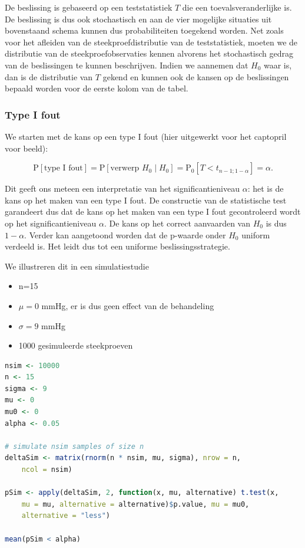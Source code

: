 \documentclass[
  12pt,dutch,coursenotes]{book}
\providecommand{\tightlist}{%
  \setlength{\itemsep}{0pt}\setlength{\parskip}{0pt}}
\begin{document}
De beslissing is gebaseerd op een teststatistiek \(T\) die een toevalsveranderlijke is. De beslissing is dus ook stochastisch en aan de vier mogelijke situaties uit bovenstaand schema kunnen dus probabiliteiten toegekend worden. Net zoals voor het afleiden van de steekproefdistributie van de teststatistiek, moeten we de distributie van de steekproefobservaties kennen alvorens het stochastisch gedrag van de beslissingen te kunnen beschrijven. Indien we aannemen dat \(H_0\) waar is, dan is de distributie van \(T\) gekend en kunnen ook de kansen op de beslissingen bepaald worden voor de eerste kolom van de tabel.

\hypertarget{type-i-fout}{%
\subsubsection{Type I fout}\label{type-i-fout}}

We starten met de kans op een type I fout (hier uitgewerkt voor het captopril voor beeld):

\[\text{P}\left[\text{type I fout}\right]=\text{P}\left[\text{verwerp }H_0 \mid H_0\right] = \text{P}_0\left[T<t_{n-1;1-\alpha}\right]=\alpha.\]

Dit geeft ons meteen een interpretatie van het significantieniveau \(\alpha\): het is de kans op het maken van een type I fout. De constructie van de statistische test garandeert dus dat de kans op het maken van een type I fout gecontroleerd wordt op het significantieniveau \(\alpha\). De kans op het correct aanvaarden van \(H_0\) is dus \(1-\alpha\).
Verder kan aangetoond worden dat de p-waarde onder \(H_0\) uniform verdeeld is. Het leidt dus tot een uniforme beslissingsstrategie.

We illustreren dit in een simulatiestudie

\begin{itemize}
\tightlist
\item
  n=15
\item
  \(\mu=0\) mmHg, er is dus geen effect van de behandeling
\item
  \(\sigma =9\) mmHg
\item
  1000 gesimuleerde steekproeven
\end{itemize}

\begin{lstlisting}[language=R]
nsim <- 10000
n <- 15
sigma <- 9
mu <- 0
mu0 <- 0
alpha <- 0.05

# simulate nsim samples of size n
deltaSim <- matrix(rnorm(n * nsim, mu, sigma), nrow = n,
    ncol = nsim)

pSim <- apply(deltaSim, 2, function(x, mu, alternative) t.test(x,
    mu = mu, alternative = alternative)$p.value, mu = mu0,
    alternative = "less")

mean(pSim < alpha)
\end{lstlisting}
\end{document}
